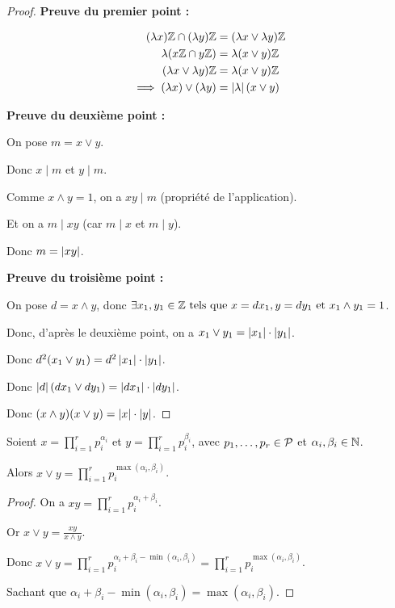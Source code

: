 \documentclass[12pt,a4paper]{report}
\begin{document}
\begin{proof}
    \textbf{Preuve du premier point :}

    \begin{align*}
    (\lambda x)\mathbb{Z} \cap (\lambda y)\mathbb{Z} &= (\lambda x \vee \lambda y)\mathbb{Z}\\
    \lambda (x\mathbb{Z} \cap y\mathbb{Z}) &= \lambda(x \vee y)\mathbb{Z}\\
    (\lambda x \vee \lambda y)\mathbb{Z} &= \lambda (x \vee y)\mathbb{Z}\\
    \implies (\lambda x) \vee (\lambda y) &= \left|\lambda\right| (x \vee y)
    \end{align*}

    \textbf{Preuve du deuxième point :}

    On pose $m= x \vee y$.

    Donc $x\mid m$ et $y \mid m$.

    Comme $x \wedge y = 1$, on a $xy \mid m$ (propriété de l'application).

    Et on a $m \mid xy$ (car $m \mid x$ et $m \mid y$).

    Donc $m = \left|xy\right|$.

    \textbf{Preuve du troisième point :}

    On pose $d=x \wedge y$, donc $\exists x_1,y_1 \in \mathbb{Z} \text{ tels que } x= dx_1, y=dy_1 \text{ et } x_1 \wedge y_1 = 1$.

    Donc, d'après le deuxième point, on a $x_1 \vee y_1 = \left|x_1\right|\cdot\left|y_1\right|$.

    Donc $d^2(x_1 \vee y_1) = d^2 \left|x_1\right|\cdot\left|y_1\right|$.

    Donc $\left|d\right|(dx_1 \vee dy_1) = \left|dx_1\right|\cdot\left|dy_1\right|$.

    Donc $(x \wedge y)(x \vee y) = \left|x\right|\cdot\left|y\right|$.
\end{proof}

\begin{theorem}
    Soient $x = \prod_{i=1}^{r}p_i^{\alpha_i}$ et $y = \prod_{i=1}^{r} p_i^{\beta_i}$, avec $p_1,\dots,p_r \in \mathcal{P}$ et $\alpha_i,\beta_i \in \mathbb{N}$.

    Alors $x \vee y = \prod_{i=1}^{r} p_i^{\max(\alpha_i,\beta_i)}$.
\end{theorem}

\begin{proof}
    On a $xy = \prod_{i=1}^{r}p_i^{\alpha_i + \beta_i}$.

    Or $x \vee y = \frac{xy}{x\wedge y}$.

    Donc $x \vee y = \prod_{i=1}^{r} p_i^{\alpha_i + \beta_i - \min(\alpha_i,\beta_i)} = \prod_{i=1}^{r} p_i^{\max(\alpha_i,\beta_i)}$.

    Sachant que $\alpha_i + \beta_i - \min(\alpha_i,\beta_i) = \max(\alpha_i,\beta_i)$.
\end{proof}
\end{document}
